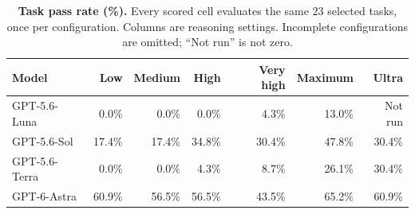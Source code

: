 \documentclass{article}
\begin{document}
\printAffiliationsAndNotice{}
\begin{abstract}
Scientific coding agents must turn a diagnosis of a changing physical system into an executable intervention. We study this gap in simulated surface-code quantum error correction, auditing all 760 score-selected decoder episodes with exact-input transcript judgments while retaining cohort-specific contracts and measured scores. The highest observed model pass rate is 65.2\% on 23 shared tasks; across 533 recorded evaluation episodes, joint success is 27.0\%, diagnosis accuracy is 60.4\%, and 55.1\% of scored episodes with a correct diagnosis fail repair. A three-level MECE taxonomy separates decoder repair, delivery, and diagnosis failures, and trajectory inspection identifies validation broadcasting, incorrect regime dispatch, and localization over-reporting as concrete failure paths. A frozen visible-only baseline passes 27/92 fresh within-family candidates with wide hierarchical uncertainty, while sparse model coverage precludes ranking. The released aggregate evidence and reproducible figures characterize an audited development corpus, not held-out frontier-model capability or hardware performance.
\end{abstract}

\begin{table}[t]
\centering\small
\caption{\textbf{Task pass rate (\%).} Every scored cell evaluates the same 23 selected tasks, once per configuration. Columns are reasoning settings. Incomplete configurations are omitted; ``Not run'' is not zero.}
\label{tab:model-scores}
\setlength{\tabcolsep}{5pt}
\begin{tabular}{@{}lrrrrrr@{}}\toprule
Model & Low & Medium & High & Very high & Maximum & Ultra\\\midrule
GPT-5.6-Luna & 0.0\% & 0.0\% & 0.0\% & 4.3\% & 13.0\% & Not run\\
GPT-5.6-Sol & 17.4\% & 17.4\% & 34.8\% & 30.4\% & 47.8\% & 30.4\%\\
GPT-5.6-Terra & 0.0\% & 0.0\% & 4.3\% & 8.7\% & 26.1\% & 30.4\%\\
GPT-6-Astra & 60.9\% & 56.5\% & 56.5\% & 43.5\% & 65.2\% & 60.9\%\\
\bottomrule
\end{tabular}
\end{table}
\end{document}
